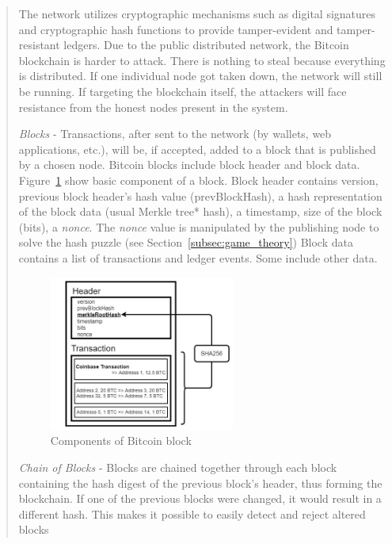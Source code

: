 \begin{itemize}
\begin{quote}
	The network utilizes cryptographic mechanisms such as digital signatures and cryptographic hash functions to provide tamper-evident and tamper-resistant ledgers.
	Due to the public distributed network, the Bitcoin blockchain is harder to attack. There is nothing to steal because everything is distributed. If one individual node got taken down, the network will still be running. 
	If targeting the blockchain itself, the attackers will face resistance from the honest nodes present in the system. 
	\bigbreak

	\emph{Blocks} -	
	Transactions, after sent to the network (by wallets, web applications, etc.), will be, if accepted, added to a block that is published by a chosen node. 
	Bitcoin blocks include block header and block data.
	Figure~\ref{fig:block_component} show basic component of a block.
	Block header contains version, previous block header’s hash value (prevBlockHash), a hash representation of the block data (usual Merkle tree* hash), a timestamp, size of the block (bits), a \emph{nonce}.
	The \emph{nonce} value is manipulated by the publishing node to solve the hash puzzle (see Section~\ref{subsec:game_theory})
	Block data contains a list of transactions and ledger events. Some include other data.
	\pagebreak

	\begin{figure}[h!]
		\centering
		\includegraphics[width=0.6\textwidth]{images/block_component.jpg}
		\caption[Components of Bitcoin block]{Components of Bitcoin block}
		\label{fig:block_component}
	\end{figure}

	\emph{Chain of Blocks} - 
	Blocks are chained together through each block containing the hash digest of the previous block’s header, thus forming the blockchain.
	If one of the previous blocks were changed, it would result in a different hash.
	This makes it possible to easily detect and reject altered blocks


\end{quote}
\end{itemize}
